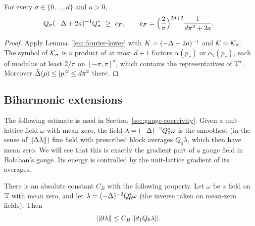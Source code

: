 \begin{corollary}\label{cor:QKQ-lower}
For every $\sigma\in\{0,\dots,d\}$ and $a>0$,
\[
Q_\sigma(-\Lap+2a)^{-1}Q_\sigma^*\ \ge\ c_F,\qquad c_F=\Big(\frac2\pi\Big)^{2d+2}\frac1{d\pi^2+2a}.
\]
\end{corollary}

\begin{proof}
Apply Lemma~\ref{lem:fourier-lower} with $K=(-\Delta+2a)^{-1}$ and $\mathcal K=\mathcal K_\sigma$. The symbol of $\mathcal K_\sigma$ is a product of at most $d+1$ factors $\alpha(p_\nu)$ or $\alpha_c(p_\nu)$, each of modulus at least $2/\pi$ on $[-\pi,\pi]^d$, which contains the representatives of $\mathbb T^*$. Moreover $\hat{\Delta}(p)\le|p|^2\le d\pi^2$ there.
\end{proof}

\subsection{Biharmonic extensions}\label{ss:4.3}

The following estimate is used in Section~\ref{sec:gauge-coercivity}. Given a unit-lattice field $\omega$ with mean zero, the field $\lambda=(-\Delta)^{-2}Q_0^*\omega$ is the smoothest (in the sense of $\|\Delta\lambda\|$) fine field with prescribed block averages $Q_0\lambda$, which then have mean zero. We will see that this is exactly the gradient part of a gauge field in Ba\l aban's gauge. Its energy is controlled by the unit-lattice gradient of its averages.

\begin{lemma}\label{lem:biharmonic}
There is an absolute constant $C_B$ with the following property. Let $\omega$ be a field on $\mathbb T$ with mean zero, and let $\lambda=(-\Delta)^{-2}Q_0^*\omega$ (the inverse taken on mean-zero fields). Then
\[
\|\partial\lambda\|\le C_B\,\|d_1 Q_0\lambda\| .
\]
\end{lemma}

